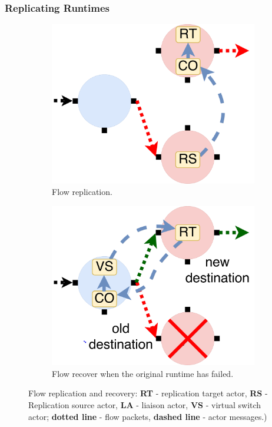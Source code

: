 \subsubsection{Replicating Runtimes}%

\begin{figure}[!t]
\begin{subfigure}[t]{0.49\linewidth}
   \centering
   \includegraphics[width=0.66\columnwidth]{figure/nfactor-replication.pdf}
   \caption{Flow replication.}\label{fig:rep}
  \end{subfigure}
  \begin{subfigure}[t]{0.49\linewidth}
     \centering
     \includegraphics[width=0.66\columnwidth]{figure/nfactor-recover.pdf}
     \caption{Flow recover when the original runtime has failed.}\label{fig:recover}
    \end{subfigure}
 \caption{Flow replication and recovery: \textbf{RT} - replication target actor, \textbf{RS} - Replication source actor, \textbf{LA} - liaison actor, \textbf{VS} - virtual switch actor; \textbf{dotted line} - flow packets, \textbf{dashed line} - actor messages.)}
\label{fig:flow-rep}
\end{figure}

